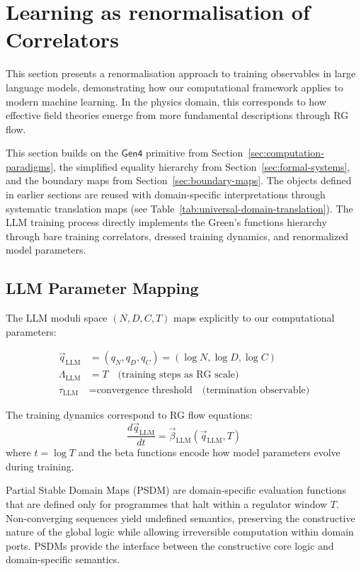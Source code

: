 \section{Learning as renormalisation of Correlators}
\label{sec:llm_rg}

This section presents a renormalisation approach to training observables in large language models, demonstrating how our computational framework applies to modern machine learning. In the physics domain, this corresponds to how effective field theories emerge from more fundamental descriptions through RG flow.

This section builds on the $\mathsf{Gen4}$ primitive from Section~\ref{sec:computation-paradigms}, the simplified equality hierarchy from Section~\ref{sec:formal-systems}, and the boundary maps from Section~\ref{sec:boundary-maps}. The objects defined in earlier sections are reused with domain-specific interpretations through systematic translation maps (see Table~\ref{tab:universal-domain-translation}). The LLM training process directly implements the Green's functions hierarchy through bare training correlators, dressed training dynamics, and renormalized model parameters.

\subsection{LLM Parameter Mapping}

The LLM moduli space $(N, D, C, T)$ maps explicitly to our computational parameters:

\begin{align}
\vec{q}_{\text{LLM}} &= (q_N, q_D, q_C) = (\log N, \log D, \log C) \label{eq:llm-q-map} \\
\Lambda_{\text{LLM}} &= T \quad \text{(training steps as RG scale)} \label{eq:llm-lambda-map} \\
\tau_{\text{LLM}} &= \text{convergence threshold} \quad \text{(termination observable)} \label{eq:llm-tau-map}
\end{align}

The training dynamics correspond to RG flow equations:
\begin{equation}
\frac{d\vec{q}_{\text{LLM}}}{dt} = \vec{\beta}_{\text{LLM}}(\vec{q}_{\text{LLM}}, T) \label{eq:llm-rg-flow}
\end{equation}
where $t = \log T$ and the beta functions encode how model parameters evolve during training.

\begin{definition}
\label{def:psdm}
Partial Stable Domain Maps (PSDM) are domain-specific evaluation functions that are defined only for programmes that halt within a regulator window $T$. Non-converging sequences yield undefined semantics, preserving the constructive nature of the global logic while allowing irreversible computation within domain ports. PSDMs provide the interface between the constructive core logic and domain-specific semantics.
\end{definition}

